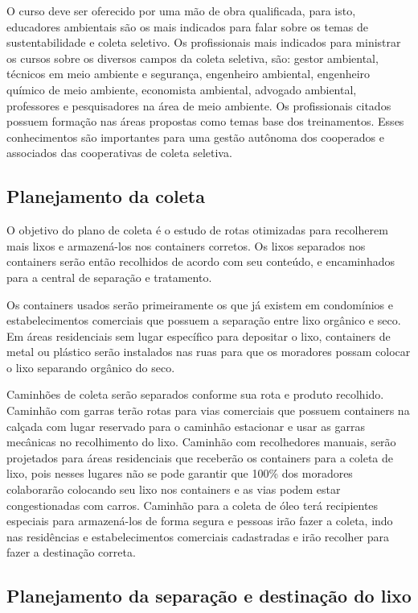    O curso deve ser oferecido por uma mão de obra qualificada, para isto, educadores ambientais são os mais indicados para falar sobre os temas de sustentabilidade e coleta seletivo. Os profissionais mais indicados para ministrar os cursos sobre os diversos campos da coleta seletiva, são: gestor ambiental, técnicos em meio ambiente e segurança, engenheiro ambiental, engenheiro químico de meio ambiente, economista ambiental, advogado ambiental, professores e pesquisadores na área de meio ambiente. Os profissionais citados possuem formação nas áreas propostas como temas base dos treinamentos. Esses conhecimentos são importantes para uma gestão autônoma dos cooperados e associados das cooperativas de coleta seletiva.


  \subsection{Planejamento da coleta}

    O objetivo do plano de coleta é o estudo de rotas otimizadas para recolherem mais lixos e armazená-los nos containers corretos. Os lixos separados nos containers serão então recolhidos de acordo com seu conteúdo, e encaminhados para a central de separação e tratamento.

    Os containers usados serão primeiramente os que já existem em condomínios e estabelecimentos comerciais que possuem a separação entre lixo orgânico e seco. Em áreas residenciais sem lugar específico para depositar o lixo, containers de metal ou plástico serão instalados nas ruas para que os moradores possam colocar o lixo separando orgânico do seco.

    Caminhões de coleta serão separados conforme sua rota e produto recolhido. Caminhão com garras terão rotas para vias comerciais que possuem containers na calçada com lugar reservado para o caminhão estacionar e usar as garras mecânicas no recolhimento do lixo. Caminhão com recolhedores manuais, serão projetados para áreas residenciais que receberão os containers para a coleta de lixo, pois nesses lugares não se pode garantir que 100\% dos moradores colaborarão colocando seu lixo nos containers e as vias podem estar congestionadas com carros. Caminhão para a coleta de óleo terá recipientes especiais para armazená-los de forma segura e pessoas irão fazer a coleta, indo nas residências e estabelecimentos comerciais cadastradas e irão recolher para fazer a destinação correta.

  \subsection{Planejamento da separação e destinação do lixo}

